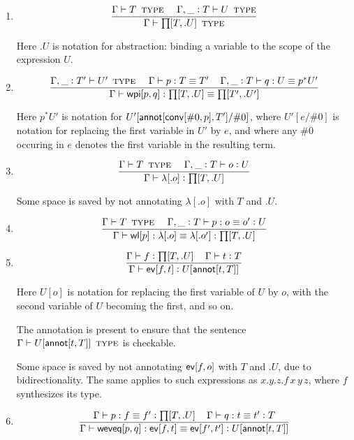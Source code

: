 \documentclass[11pt]{article}
\newcommand{\eqd}{\equiv}
\newcommand{\spc}{{\,\,\,\,\,\,\,}}
\newcommand{\ccolon}[1]{\vcentcolon#1}
\newcommand{\ccheck}[1]{\vcentcolon#1}  %
\newcommand{\synth}[1]{\vcentcolon(\Rightarrow#1)} %
\renewcommand{\synth}[1]{\ccheck#1} %
\newcommand{\Type}{\mathop{\text{ \sc type}}}
\newcommand{\ha}[2]{#1[#2]}
\newcommand{\annot}{{\sf annot}}
\newcommand{\conv}{{\sf conv}}
\newcommand{\ev}{{\sf ev}}
\newcommand{\weveq}{{\sf weveq}}
\newcommand{\wl}{{\sf wl}}
\newcommand{\wpi}{{\sf wpi}}
\newcommand{\var}{\char`_}
\begin{document}
\begin{enumerate}

\item 
$$\frac{\Gamma \vdash T \Type \spc \Gamma, \var \ccolon{T}\vdash U\Type}{\Gamma\vdash \ha\prod{T,.U}\Type}$$

Here $.U$ is notation for abstraction: binding a variable to the scope of the expression $U$.

\item 
$$ \frac{ 
  \Gamma, \var \ccolon{T'} \vdash U'  \Type      \spc 
  \Gamma     \vdash p:T \eqd T'    \spc
  \Gamma,  \var \ccolon{T}  \vdash q:U \eqd p^*U'
  } {
  \Gamma     \vdash \ha\wpi{p,q}:\ha\prod{T,.U}\eqd \ha\prod{T',.U'}
}$$

Here ${p}^*U'$ is notation for $U'[\ha\annot{\ha\conv{\#0,p},T'}/\#0]$, where
$U'[e/\#0]$ is notation for replacing the first variable in $U'$ by $e$, and
where any $\#0$ occuring in $e$ denotes the first variable in the resulting
term.

\item 
$$\frac{\Gamma \vdash T \Type \spc \Gamma, \var \ccolon{T}\vdash o \ccheck{U}}{\Gamma\vdash \ha\lambda{.o} \ccheck{\ha\prod{T,.U}}}$$

Some space is saved by not annotating $\ha\lambda{.o}$ with $T$ and $.U$.

\item 
$$\frac{\Gamma \vdash T \Type \spc \Gamma, \var \ccolon{T}\vdash p : o\eqd o' \ccheck{U}}{\Gamma\vdash \ha\wl{p} : \ha\lambda{.o}\eqd \ha\lambda{.o'} : \ha\prod{T,.U}}$$

\item 
$$\frac{\Gamma\vdash f \ccolon{\ha\prod{T,.U}}\spc \Gamma\vdash t \ccheck{T}}{\Gamma\vdash \ha\ev{f,t} \synth{U[\ha\annot{t,T}]}}$$

Here $U[o]$ is notation for replacing the first variable of $U$ by $o$, with
the second variable of $U$ becoming the first, and so on.  

The annotation is present to ensure that the sentence $\Gamma \vdash
U[\ha\annot{t,T}] \Type$ is checkable.

Some space is saved by not annotating $\ha\ev{f,o}$ with $T$ and $.U$, due to
bidirectionality.  The same applies to such expressions as $x.y.z.f\, x\, y\,
z$, where $f$ synthesizes its type.

\item 
$$\frac{
   \Gamma\vdash p : f \eqd f' \synth{\ha\prod{T,.U}}\spc 
   \Gamma\vdash q : t \eqd t' \ccheck{T}
   }{
   \Gamma\vdash \ha\weveq{p,q} : \ha\ev{f,t} \eqd \ha\ev{f',t'} \synth{U[\ha\annot{t,T}]}
  }$$


\end{enumerate}
\end{document}
